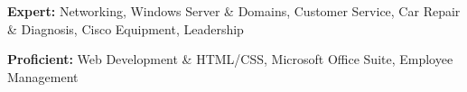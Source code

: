 \textbf{Expert:} Networking, Windows Server \& Domains, Customer Service, Car Repair \& Diagnosis, Cisco Equipment, Leadership 

\spacing{}

\textbf{Proficient:} Web Development \& HTML/CSS, Microsoft Office Suite, Employee Management

